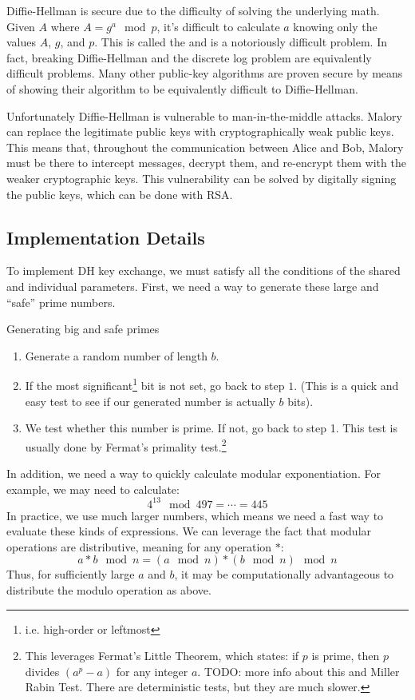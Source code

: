 Diffie-Hellman is secure due to the difficulty of solving the underlying math. Given $A$ where $A = g^a \mod p$, it's difficult to calculate $a$ knowing only the values $A$, $g$, and $p$. This is called the  and is a notoriously difficult problem. In fact, breaking Diffie-Hellman and the discrete log problem are equivalently difficult problems. Many other public-key algorithms are proven secure by means of showing their algorithm to be equivalently difficult to Diffie-Hellman.

Unfortunately Diffie-Hellman is vulnerable to man-in-the-middle attacks. Malory can replace the legitimate public keys with cryptographically weak public keys. This means that, throughout the communication between Alice and Bob, Malory must be there to intercept messages, decrypt them, and re-encrypt them with the weaker cryptographic keys. This vulnerability can be solved by digitally signing the public keys, which can be done with RSA.

\subsection{Implementation Details}
To implement DH key exchange, we must satisfy all the conditions of the shared and individual parameters. First, we need a way to generate these large and ``safe'' prime numbers.

\begin{tecbox}{Generating big and safe primes}{}
\begin{enumerate}
    \item Generate a random number of length $b$.
    \item If the most significant\footnote{i.e. high-order or leftmost} bit is not set, go back to step $1$. (This is a quick and easy test to see if our generated number is actually $b$ bits).
    \item We test whether this number is prime. If not, go back to step 1. This test is usually done by Fermat's primality test.\footnote{This leverages Fermat's Little Theorem, which states: if $p$ is prime, then $p$ divides $(a^p - a)$ for any integer $a$. TODO: more info about this and Miller Rabin Test. There are deterministic tests, but they are much slower.}
\end{enumerate}
\end{tecbox}

In addition, we need a way to quickly calculate modular exponentiation. For example, we may need to calculate:
\[ 4^{13} \mod 497 = \cdots = 445 \]
In practice, we use much larger numbers, which means we need a fast way to evaluate these kinds of expressions. We can leverage the fact that modular operations are distributive, meaning for any operation $*$:
\[ a * b \mod n = (a \mod n) * (b \mod n) \mod n \]
Thus, for sufficiently large $a$ and $b$, it may be computationally advantageous to distribute the modulo operation as above.

